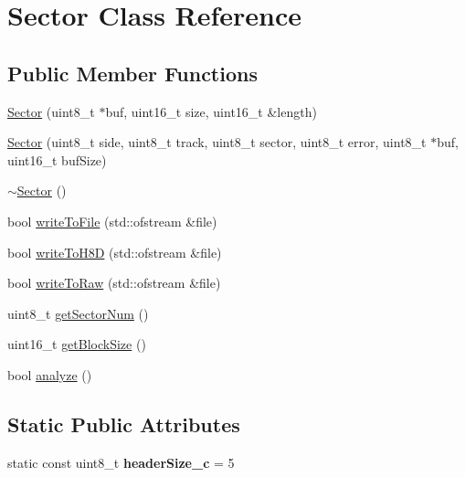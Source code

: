 \hypertarget{classSector}{}\section{Sector Class Reference}
\label{classSector}
\subsection*{Public Member Functions}
\begin{DoxyCompactItemize}
\item 
\hyperlink{classSector_a41c1446e3b2042e1789496b531d2ee3e}{Sector} (uint8\+\_\+t $\ast$buf, uint16\+\_\+t size, uint16\+\_\+t \&length)
\item 
\hyperlink{classSector_abe23ebb64205954042b9f6225509797e}{Sector} (uint8\+\_\+t side, uint8\+\_\+t track, uint8\+\_\+t sector, uint8\+\_\+t error, uint8\+\_\+t $\ast$buf, uint16\+\_\+t buf\+Size)
\item 
\hyperlink{classSector_aa0f54aaf079dd7461400684bf0be15ff}{$\sim$\+Sector} ()
\item 
bool \hyperlink{classSector_aee348b3b95e5cbf896935db4bb801f11}{write\+To\+File} (std\+::ofstream \&file)
\item 
bool \hyperlink{classSector_a1d529e827a6c86e0be70a41e09d2cd6a}{write\+To\+H8\+D} (std\+::ofstream \&file)
\item 
bool \hyperlink{classSector_ad7467579400021844e83269c21b538f1}{write\+To\+Raw} (std\+::ofstream \&file)
\item 
uint8\+\_\+t \hyperlink{classSector_a03c03368b93b01bf6f7c21e2e07d7020}{get\+Sector\+Num} ()
\item 
uint16\+\_\+t \hyperlink{classSector_aaeb58606a9aef50b0c9852c3652cc739}{get\+Block\+Size} ()
\item 
bool \hyperlink{classSector_aa112f0aa899e1b8b75f11d16a6f0dbb2}{analyze} ()
\end{DoxyCompactItemize}
\subsection*{Static Public Attributes}
\begin{DoxyCompactItemize}
\item 
\hypertarget{classSector_a7e01b4a23ace12dfc297a66e18ac1b8f}{}static const uint8\+\_\+t {\bfseries header\+Size\+\_\+c} = 5\label{classSector_a7e01b4a23ace12dfc297a66e18ac1b8f}

\end{DoxyCompactItemize}
